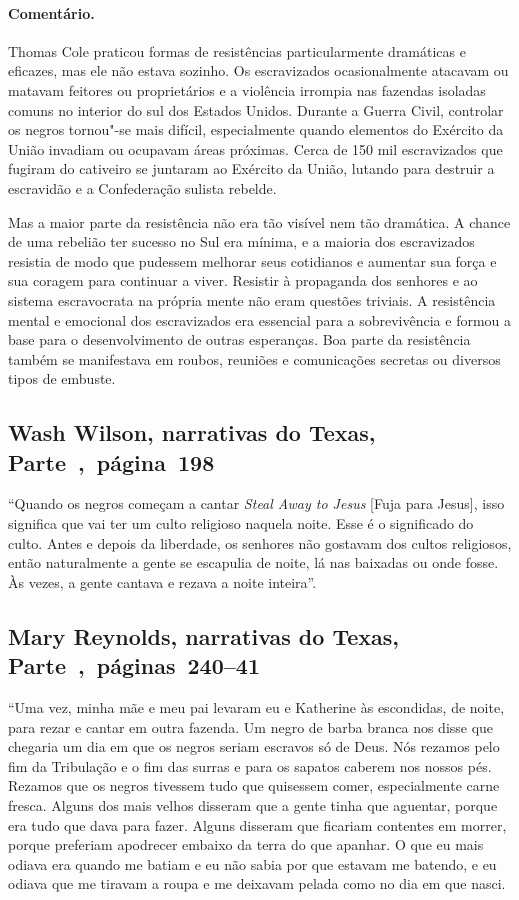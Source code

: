 \paragraph{Comentário.}\quad
{\small
Thomas Cole praticou formas de resistências particularmente
dramáticas e eficazes, mas ele não estava sozinho. Os escravizados
ocasionalmente atacavam ou matavam feitores ou proprietários e a
violência irrompia nas fazendas isoladas comuns no interior do sul dos
Estados Unidos. Durante a Guerra Civil, controlar os negros tornou"-se
mais difícil, especialmente quando elementos do Exército da União
invadiam ou ocupavam áreas próximas. Cerca de 150 mil escravizados que
fugiram do cativeiro se juntaram ao Exército da União, lutando para
destruir a escravidão e a Confederação sulista rebelde.

Mas a maior parte da resistência não era tão visível nem tão
dramática. A chance de uma rebelião ter sucesso no Sul era mínima, e a
maioria dos escravizados resistia de modo que pudessem melhorar seus
cotidianos e aumentar sua força e sua coragem para continuar a viver.
Resistir à propaganda dos senhores e ao sistema escravocrata na própria
mente não eram questões triviais. A resistência mental e emocional dos
escravizados era essencial para a sobrevivência e formou a base para o
desenvolvimento de outras esperanças. Boa parte da resistência também se
manifestava em roubos, reuniões e comunicações secretas ou diversos
tipos de embuste.
}

\subsection{Wash Wilson, narrativas do Texas, Parte~,~página~198}
\label{ref302}

``Quando os negros começam a cantar \emph{Steal Away to Jesus} {[}Fuja para
Jesus{]}, isso significa que vai ter um culto religioso naquela noite.
Esse é o significado do culto. Antes e depois da liberdade, os senhores
não gostavam dos cultos religiosos, então naturalmente a gente se
escapulia de noite, lá nas baixadas ou onde fosse. Às vezes, a gente
cantava e rezava a noite inteira''.

\subsection{Mary Reynolds, narrativas do Texas, Parte~,~páginas~240--41}
\label{ref223}

``Uma vez, minha mãe e meu pai levaram eu e Katherine às escondidas, de
noite, para rezar e cantar em outra fazenda. Um negro de barba branca
nos disse que chegaria um dia em que os negros seriam escravos só de
Deus. Nós rezamos pelo fim da Tribulação e o fim das surras e para os
sapatos caberem nos nossos pés. Rezamos que os negros tivessem tudo que
quisessem comer, especialmente carne fresca. Alguns dos mais velhos
disseram que a gente tinha que aguentar, porque era tudo que dava para
fazer. Alguns disseram que ficariam contentes em morrer, porque
preferiam apodrecer embaixo da terra do que apanhar. O que eu mais
odiava era quando me batiam e eu não sabia por que estavam me batendo, e
eu odiava que me tiravam a roupa e me deixavam pelada como no dia em que
nasci.

